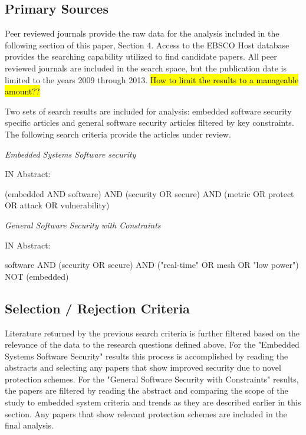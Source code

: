 \documentclass[draftcls,onecolumn,conference,12pt]{IEEEtran}
\begin{document}
\subsection{Primary Sources}

Peer reviewed journals provide the raw data for the analysis included in the following section of this paper, Section 4.  Access to the EBSCO Host database provides the searching capability utilized to find candidate papers.  All peer reviewed journals are included in the search space, but the publication date is limited to the years 2009 through 2013.  \hl{How to limit the results to a manageable amount??}

Two sets of search results are included for analysis: embedded software security specific articles and general software security articles filtered by key constraints.  The following search criteria provide the articles under review. 

\textit{Embedded Systems Software security}

IN Abstract:

\begin{center}
(embedded AND software) AND (security OR secure) AND (metric OR protect OR attack OR vulnerability)
\end{center}

\textit{General Software Security with Constraints}

IN Abstract:
\begin{center}
software AND (security OR secure) AND ("real-time" OR mesh OR "low power") NOT (embedded)
\end{center}

\subsection{Selection / Rejection Criteria}

Literature returned by the previous search criteria is further filtered based on the relevance of the data to the research questions defined above.  For the "Embedded Systems Software Security" results this process is accomplished by reading the abstracts and selecting any papers that show improved security due to novel protection schemes. For the "General Software Security with Constraints" results, the papers are filtered by reading the abstract and comparing the scope of the study to embedded system criteria and trends as they are described earlier in this section. Any papers that show relevant protection schemes are included in the final analysis.
\end{document}
